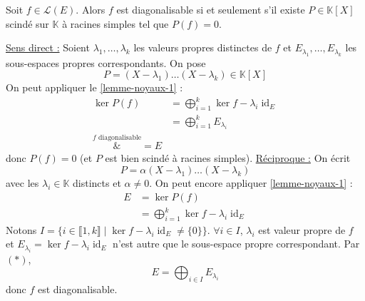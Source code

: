 	\begin{application}
		Soit $f \in \mathcal{L}(E)$. Alors $f$ est diagonalisable si et seulement s'il existe $P \in \mathbb{K}[X]$ scindé sur $\mathbb{K}$ à racines simples tel que $P(f) = 0$.
	\end{application}

	\begin{demonstration}
		\underline{Sens direct :} Soient $\lambda_1, \dots, \lambda_k$ les valeurs propres distinctes de $f$ et $E_{\lambda_1}, \dots, E_{\lambda_k}$ les sous-espaces propres correspondants. On pose
		\[ P = (X-\lambda_1) \dots (X-\lambda_k) \in \mathbb{K}[X] \]
		On peut appliquer le \cref{lemme-noyaux-1} :
		\begin{align*}
			\ker{P(f)} &= \bigoplus_{i = 1}^k \ker{f - \lambda_i \operatorname{id}_E} \\
			&= \bigoplus_{i = 1}^k E_{\lambda_i} \\
			\overset{f \text{ diagonalisable}}&{=} E
		\end{align*}
		donc $P(f) = 0$ (et $P$ est bien scindé à racines simples).
		\newpar
		\underline{Réciproque :} On écrit
		\[ P = \alpha (X-\lambda_1) \dots (X-\lambda_k) \]
		avec les $\lambda_i \in \mathbb{K}$ distincts et $\alpha \neq 0$. On peut encore appliquer \cref{lemme-noyaux-1} :
		\begin{align*}
			E &= \ker{P(f)} \\
			&= \bigoplus_{i = 1}^k \ker{f - \lambda_i \operatorname{id}_E} \tag{*}
		\end{align*}
		Notons $I = \{ i \in \llbracket 1, k \rrbracket \mid \ker{f - \lambda_i \operatorname{id}_E} \neq \{ 0 \} \}$. $\forall i \in I$, $\lambda_i$ est valeur propre de $f$ et $E_{\lambda_i} = \ker{f - \lambda_i \operatorname{id}_E}$ n'est autre que le sous-espace propre correspondant. Par $(*)$,
		\[ E = \bigoplus_{i \in I} E_{\lambda_i} \]
		donc $f$ est diagonalisable.
	\end{demonstration}

